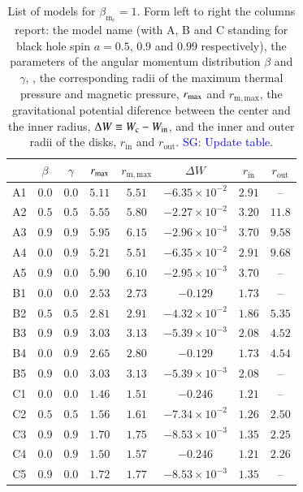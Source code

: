 \documentclass{aa}
\newcommand{\sg}[1]{\textcolor{blue}{SG: #1}}
\begin{document}
\begin{table}
\caption{List of models for $\beta_{\mathrm{m}_{\mathrm{c}}} = 1
$. Form left to right the columns report: the model name (with A, B and C standing for black hole spin $a = 0.5$, $0.9$ and $0.99$ respectively), the parameters of the angular momentum distribution $\beta$ and $\gamma$, , the corresponding radii of the maximum thermal pressure and magnetic pressure, $r_{{\rm{max}}}$ and $r_{{\mathrm{m, max}}}$, the gravitational potential diference between the center and the inner radius, $\Delta W\equiv W_{\rm c}-W_{\rm in}$, and the inner and outer radii of the disks, $r_{\mathrm{in}}$ and $r_{\mathrm{out}}$. \sg{Update table.}}             
\label{table:3}      
\centering          
\begin{tabular}{c c c c  c c c c}
\hline\hline       
 & $\beta$ & $\gamma$ & $r_{\rm{max}}$ &  $r_{\mathrm{m, max}}$ & $\Delta W$ & $r_{\mathrm{in}}$ & $r_{\mathrm{out}}$ \\ 
\hline           
A1 & $0.0$ & $0.0$ &  $5.11$  & $5.51$ & $-6.35 \times 10^{-2}$ & $2.91$ & -- \\ 
A2 & $0.5$ & $0.5$ & $5.55$ &  $5.80$  & $-2.27 \times 10^{-2}$ & $3.20$ & $11.8$\\ 
A3 & $0.9$ & $0.9$ & $5.95$ &  $6.15$  & $-2.96 \times 10^{-3}$ & $3.70$ &  $9.58$\\ 
A4 & $0.0$ & $0.9$ & $5.21$ &  $5.51$  & $-6.35 \times 10^{-2}$ & $2.91$ & $9.68$\\ 
A5 & $0.9$ & $0.0$ & $5.90$ &  $6.10$  & $-2.95 \times 10^{-3}$ & $3.70$ & --\\ 
 \hline 
B1 & $0.0$ & $0.0$ & $2.53$ &  $2.73$  & $-0.129$ & $1.73$ & -- \\ 
B2 & $0.5$ & $0.5$ & $2.81$ &  $2.91$  & $-4.32 \times 10^{-2}$ & $1.86$ & $5.35$\\ 
B3 & $0.9$ & $0.9$ & $3.03$ &  $3.13$  & $-5.39 \times 10^{-3}$ & $2.08$ & $4.52$\\ 
B4 & $0.0$ & $0.9$ & $2.65$ &  $2.80$  & $-0.129$ & $1.73$ & $4.54$\\ 
B5 & $0.9$ & $0.0$ & $3.03$ &  $3.13$  & $-5.39 \times 10^{-3}$ & $2.08$ & -- \\  
 \hline 
C1 & $0.0$ & $0.0$ & $1.46$ & $1.51$ & $-0.246$ & $1.21$ & -- \\ 
C2 & $0.5$ & $0.5$ & $1.56$ &  $1.61$  & $-7.34 \times 10^{-2}$ & $1.26$ & $2.50$\\ 
C3 & $0.9$ & $0.9$ & $1.70$ &  $1.75$  & $-8.53 \times 10^{-3}$ & $1.35$ & $2.25$\\ 
C4 & $0.0$ & $0.9$ & $1.50$ &  $1.57$  & $-0.246$ & $1.21$ & $2.26$\\ 
C5 & $0.9$ & $0.0$ & $1.72$ &  $1.77$  & $-8.53 \times 10^{-3}$ & $1.35$ & --\\ 
\hline      
\end{tabular}
\end{table}
\end{document}
